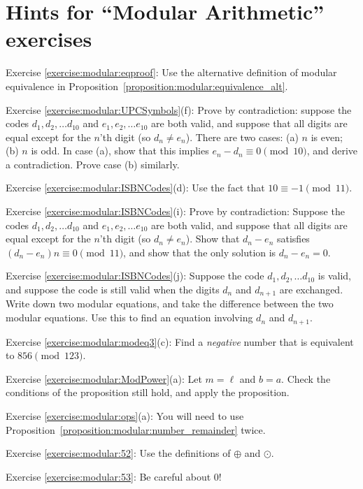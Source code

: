 \section{Hints for ``Modular Arithmetic'' exercises}\label{sec:modular_arithmetic:hints}

\noindent Exercise \ref{exercise:modular:eqproof}: Use the alternative definition of modular equivalence in Proposition~\ref{proposition:modular:equivalence_alt}.

\noindent Exercise \ref{exercise:modular:UPCSymbols}(f): Prove by contradiction: 
suppose the codes  $d_1, d_2, \ldots  d_{10}$  and $e_1, e_2, \ldots  e_{10}$ are both valid, and suppose that all digits are equal except for the $n$'th digit (so $d_n \neq e_n$).
There are two cases: (a) $n$ is even; (b) $n$ is odd. In case (a), show that this implies $e_n - d_n \equiv 0  \pmod{10}$, and derive a contradiction. Prove case (b) similarly.

\noindent Exercise \ref{exercise:modular:ISBNCodes}(d): Use the fact that $10 \equiv -1 \pmod{11}$.

\noindent Exercise \ref{exercise:modular:ISBNCodes}(i): Prove by contradiction: Suppose the codes  $d_1, d_2, \ldots  d_{10}$  and $e_1, e_2, \ldots  e_{10}$ are both valid, and suppose that all digits are equal except for the $n$'th digit (so $d_n \neq e_n$). Show that $d_n - e_n$ satisfies $(d_n - e_n)n \equiv 0 \pmod{11}$, and show that the only solution is $d_n - e_n = 0$.

\noindent Exercise \ref{exercise:modular:ISBNCodes}(j): Suppose the code $d_1, d_2, \ldots  d_{10}$  is valid, and suppose the code is still valid when the digits $d_n$ and $d_{n+1}$ are exchanged. Write down two modular equations, and take the difference between the two modular equations.  Use this to find an equation involving $d_n$ and $d_{n+1}$.

\noindent Exercise \ref{exercise:modular:modeq3}(c): Find a \emph{negative} number that is equivalent to $856 \pmod{123}$.

\noindent Exercise \ref{exercise:modular:ModPower}(a): Let $m=\ell$ and $b=a$. Check the conditions of the proposition still hold, and apply the proposition.

\noindent Exercise \ref{exercise:modular:ops}(a): You will need to use Proposition~\ref{proposition:modular:number_remainder} twice.

\noindent Exercise \ref{exercise:modular:52}: Use the definitions of $\oplus$ and $\odot$.

\noindent Exercise \ref{exercise:modular:53}: Be careful about 0!

